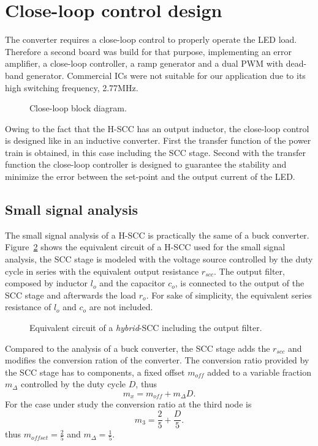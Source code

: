 \section{Close-loop control design}
The converter requires a close-loop control to properly operate the LED load.  Therefore a second board was build for that purpose, implementing an error amplifier, a close-loop controller, a ramp generator and a dual PWM with dead-band generator. Commercial ICs were not suitable for our application due to its high switching frequency, 2.77MHz.
\begin{figure}[!h]
    \centering
    
    \caption[]{Close-loop block diagram.}
    \label{fig:close_loop_diagram}
\end{figure}

Owing to the fact that the H-SCC has an output inductor, the close-loop control is designed like in an inductive converter. First the transfer function of the power train is obtained, in this case including the SCC stage. Second with the transfer function the close-loop controller is designed to guarantee the stability and minimize the error between the set-point and the output current of the LED.

\subsection{Small signal analysis}

The small signal analysis of a H-SCC is practically the same of a buck converter. Figure~\ref{fig:small_signal_hscc} shows the equivalent circuit of a H-SCC used for the small signal analysis, the SCC stage is modeled with the voltage source controlled by the duty cycle in series with the equivalent output resistance $r_{scc}$. The output filter, composed by inductor $l_o$ and the capacitor $c_o$, is connected to the output of the SCC stage and afterwards the load $r_o$. For sake of simplicity, the equivalent series resistance of $l_o$ and $c_o$ are not included.
\begin{figure}[!h]
    \centering
    
    \caption[]{Equivalent circuit of a \emph{hybrid}-SCC including the output filter.}
    \label{fig:small_signal_hscc}
\end{figure}

Compared to the analysis of a buck converter, the SCC stage adds the $r_{scc}$ and modifies the conversion ration of the converter. The conversion ratio provided by the SCC stage has to components, a fixed offset $m_{off}$ added to a variable fraction $m_{\Delta}$ controlled by the duty cycle $D$, thus
\begin{equation}
 m_{x}  = m_{off} + m_{\Delta}D.
\label{eq:m_ratio}
\end{equation}
For the case under study the conversion ratio at the third node is
\begin{equation}
 m_{3}  = \frac{2}{5} + \frac{D}{5}.
\label{eq:m3_ratio}
\end{equation}
thus $m_{offset} = \frac{2}{5}$ and $m_{\Delta}=\frac{1}{5}$.

